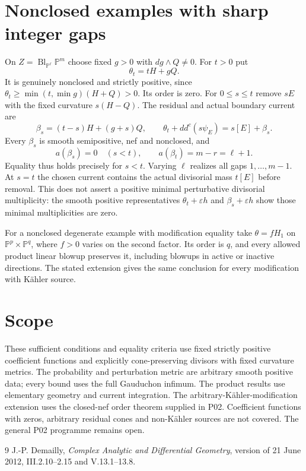 \documentclass[11pt]{article}
\newcommand{\ddc}{dd^c}
\newcommand{\PP}{\mathbb P}
\begin{document}
\section{Nonclosed examples with sharp integer gaps}
On $Z=\operatorname{Bl}_{\PP^\ell}\PP^m$ choose fixed $g>0$
with $dg\wedge Q\ne0$. For $t>0$ put
\[
 \theta_t=tH+gQ.
\]
It is genuinely nonclosed and strictly positive, since
$\theta_t\geq\min(t,\min g)(H+Q)>0$. Its order is zero.
For $0\leq s\leq t$ remove $sE$ with the fixed curvature
$s(H-Q)$. The residual and actual boundary current are
\[
 \beta_s=(t-s)H+(g+s)Q,
 \qquad \theta_t+\ddc(s\psi_E)=s[E]+\beta_s.
\]
Every $\beta_s$ is smooth semipositive, nef and nonclosed, and
\[
 a(\beta_s)=0\quad(s<t),\qquad
 a(\beta_t)=m-r=\ell+1.
\]
Equality thus holds precisely for $s<t$. Varying $\ell$ realizes
all gaps $1,\ldots,m-1$. At $s=t$ the chosen current contains
the actual divisorial mass $t[E]$ before removal. This does not
assert a positive minimal perturbative divisorial multiplicity:
the smooth positive representatives $\theta_t+\varepsilon h$ and
$\beta_s+\varepsilon h$ show those minimal multiplicities are zero.

For a nonclosed degenerate example with modification equality take
$\theta=fH_1$ on $\PP^p\times\PP^q$, where $f>0$ varies on
the second factor. Its order is $q$, and every allowed product
linear blowup preserves it, including blowups in active or inactive
directions. The stated extension gives the same conclusion for every
modification with K\"ahler source.

\section{Scope}
These sufficient conditions and equality criteria use fixed strictly
positive coefficient functions and explicitly cone-preserving divisors
with fixed curvature metrics. The probability and perturbation metric
are arbitrary smooth positive data; every bound uses the full
Gauduchon infimum. The product results use elementary geometry and
current integration. The arbitrary-K\"ahler-modification extension
uses the closed-nef order theorem supplied in P02. Coefficient functions
with zeros, arbitrary residual cones and non-K\"ahler sources are not
covered. The general P02 programme remains open.
\begin{thebibliography}{9}
J.-P. Demailly, \emph{Complex Analytic and Differential Geometry},
version of 21 June 2012, III.2.10--2.15 and V.13.1--13.8.
\end{thebibliography}
\end{document}

